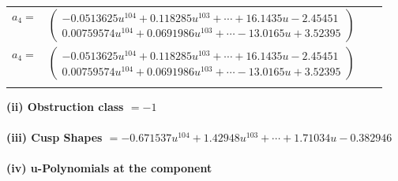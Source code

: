 \documentclass[1p]{elsarticle_modified}
\theoremstyle{definition}
\begin{document}
\begin{tabular}{m{7pt} m{180pt} m{7pt} m{180pt} }
\flushright $a_{4}=$&$\begin{pmatrix}-0.0513625 u^{104}+0.118285 u^{103}+\cdots+16.1435 u-2.45451\\0.00759574 u^{104}+0.0691986 u^{103}+\cdots-13.0165 u+3.52395\end{pmatrix}$\\ \flushright $a_{4}=$&$\begin{pmatrix}-0.0513625 u^{104}+0.118285 u^{103}+\cdots+16.1435 u-2.45451\\0.00759574 u^{104}+0.0691986 u^{103}+\cdots-13.0165 u+3.52395\end{pmatrix}$\\&\end{tabular}
\flushleft \textbf{(ii) Obstruction class $= -1$}\\~\\
\flushleft \textbf{(iii) Cusp Shapes $= -0.671537 u^{104}+1.42948 u^{103}+\cdots+1.71034 u-0.382946$}\\~\\
\newpage\renewcommand{\arraystretch}{1}
\flushleft \textbf{(iv) u-Polynomials at the component}\newline \\
\end{document}
